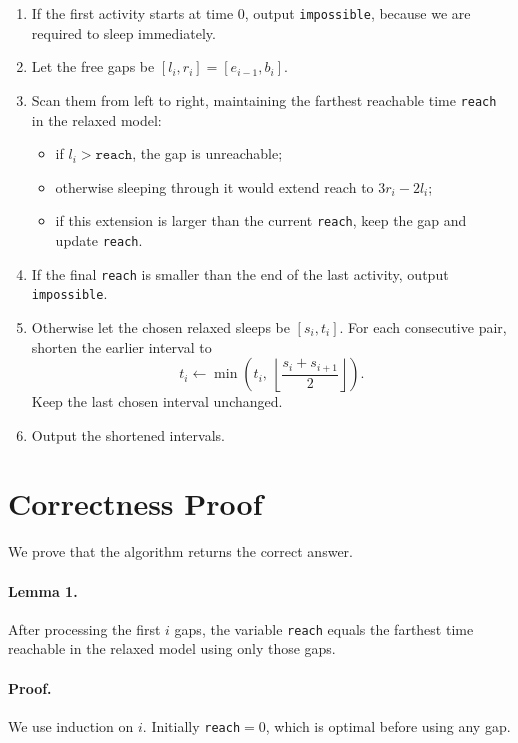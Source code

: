 \documentclass[11pt]{article}
\begin{document}
\begin{enumerate}[leftmargin=*]
    \item If the first activity starts at time $0$, output \texttt{impossible}, because we are required to sleep
    immediately.
    \item Let the free gaps be $[l_i,r_i]=[e_{i-1},b_i]$.
    \item Scan them from left to right, maintaining the farthest reachable time \texttt{reach} in the relaxed
    model:
    \begin{itemize}[leftmargin=*]
        \item if $l_i > \texttt{reach}$, the gap is unreachable;
        \item otherwise sleeping through it would extend reach to $3r_i-2l_i$;
        \item if this extension is larger than the current \texttt{reach}, keep the gap and update
        \texttt{reach}.
    \end{itemize}
    \item If the final \texttt{reach} is smaller than the end of the last activity, output \texttt{impossible}.
    \item Otherwise let the chosen relaxed sleeps be $[s_i,t_i]$. For each consecutive pair, shorten the
    earlier interval to
    \[
    t_i \leftarrow \min\!\left(t_i,\ \left\lfloor\frac{s_i+s_{i+1}}{2}\right\rfloor\right).
    \]
    Keep the last chosen interval unchanged.
    \item Output the shortened intervals.
\end{enumerate}

\section*{Correctness Proof}

We prove that the algorithm returns the correct answer.

\paragraph{Lemma 1.}
After processing the first $i$ gaps, the variable \texttt{reach} equals the farthest time reachable in the
relaxed model using only those gaps.

\paragraph{Proof.}
We use induction on $i$. Initially \texttt{reach}$=0$, which is optimal before using any gap.
\end{document}
